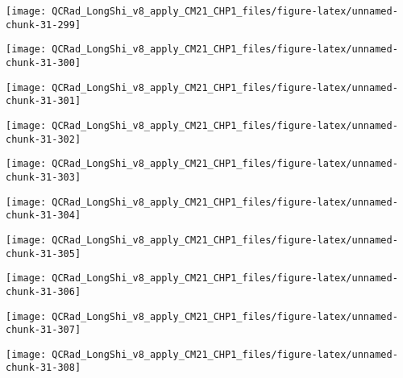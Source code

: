 \documentclass[
  10pt,
  a4paper,oneside]{article}
\begin{document}
\begin{center}\texttt{[image: QCRad\_LongShi\_v8\_apply\_CM21\_CHP1\_files/figure-latex/unnamed-chunk-31-299]} \end{center}

\begin{center}\texttt{[image: QCRad\_LongShi\_v8\_apply\_CM21\_CHP1\_files/figure-latex/unnamed-chunk-31-300]} \end{center}

\begin{center}\texttt{[image: QCRad\_LongShi\_v8\_apply\_CM21\_CHP1\_files/figure-latex/unnamed-chunk-31-301]} \end{center}

\begin{center}\texttt{[image: QCRad\_LongShi\_v8\_apply\_CM21\_CHP1\_files/figure-latex/unnamed-chunk-31-302]} \end{center}

\begin{center}\texttt{[image: QCRad\_LongShi\_v8\_apply\_CM21\_CHP1\_files/figure-latex/unnamed-chunk-31-303]} \end{center}

\begin{center}\texttt{[image: QCRad\_LongShi\_v8\_apply\_CM21\_CHP1\_files/figure-latex/unnamed-chunk-31-304]} \end{center}

\begin{center}\texttt{[image: QCRad\_LongShi\_v8\_apply\_CM21\_CHP1\_files/figure-latex/unnamed-chunk-31-305]} \end{center}

\begin{center}\texttt{[image: QCRad\_LongShi\_v8\_apply\_CM21\_CHP1\_files/figure-latex/unnamed-chunk-31-306]} \end{center}

\begin{center}\texttt{[image: QCRad\_LongShi\_v8\_apply\_CM21\_CHP1\_files/figure-latex/unnamed-chunk-31-307]} \end{center}

\begin{center}\texttt{[image: QCRad\_LongShi\_v8\_apply\_CM21\_CHP1\_files/figure-latex/unnamed-chunk-31-308]} \end{center}
\end{document}
